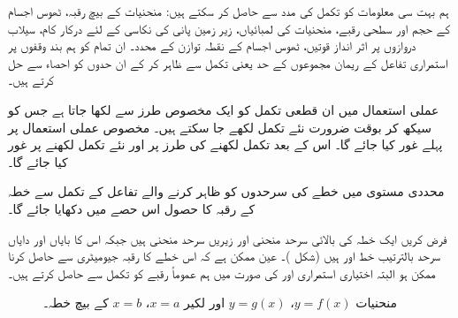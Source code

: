 
\quad
ہم بہت سی معلومات کو تکمل کی مدد سے حاصل کر سکتے ہیں: منحنیات کے بیچ رقبہ، ٹھوس اجسام کے حجم اور سطحی رقبے، منحنیات کی لمبائیاں، زیر زمین پانی کی نکاسی کے لئے درکار کام، سیلاب دروازوں پر اثر انداز قوتیں، ٹھوس اجسام کے نقطہ توازن کے محدد۔ ان تمام کو ہم بند وقفوں پر استمراری تفاعل کے ریمان مجموعوں کے حد یعنی تکمل سے ظاہر کر کے ان حدوں  کو  احصاء سے حل کرتے ہیں۔

عملی استعمال میں ان قطعی تکمل کو ایک مخصوص طرز سے لکھا جاتا ہے جس کو سیکھ کر بوقت ضرورت  نئے تکمل لکھے جا سکتے ہیں۔ مخصوص عملی استعمال پر پہلے غور کیا جائے گا۔ اس کے بعد تکمل لکھنے کی طرز پر اور نئے تکمل لکھنے پر غور کیا جائے گا۔

محددی مستوی میں خطے کی سرحدوں کو ظاہر کرنے والے تفاعل کے تکمل سے خطہ کے رقبہ کا حصول اس حصے میں دکھایا جائے گا۔

فرض کریں ایک خطہ کی بالائی سرحد  منحنی  اور زیریں سرحد منحنی  ہیں جبکہ اس کا بایاں اور دایاں سرحد بالترتیب خط  اور  ہیں (شکل )۔ عین ممکن ہے کہ اس خطے کا رقبہ جیومیٹری سے حاصل کرنا ممکن ہو البتہ اختیاری استمراری  اور  کی صورت میں ہم عموماً رقبے کو تکمل سے حاصل کرتے ہیں۔ 
\begin{figure}
\centering
{}
\caption{
منحنیات $y=f(x)$، $y=g(x)$ اور لکیر $x=a$، $x=b$ کے بیچ خطہ۔
}
\label{شکل_استعمال_تکمل_منحنیات_بیچ}
\end{figure}

